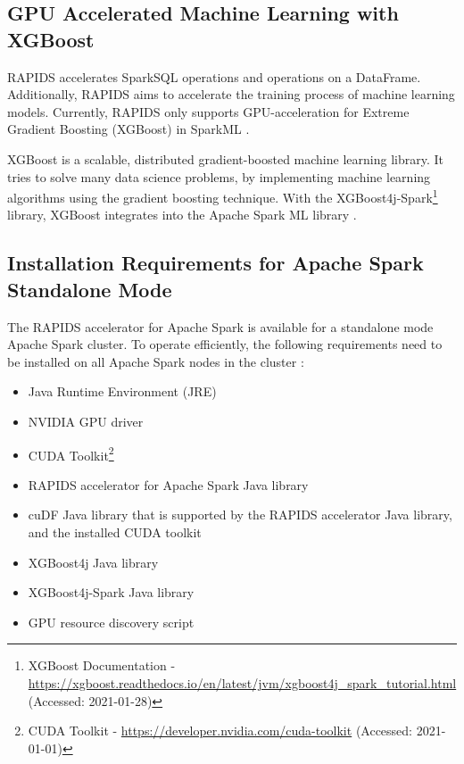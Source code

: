 \subsection{GPU Accelerated Machine Learning with XGBoost}
RAPIDS accelerates SparkSQL operations and operations on a DataFrame. Additionally, RAPIDS aims to accelerate the training process of machine learning models.
Currently, RAPIDS only supports GPU-acceleration for Extreme Gradient Boosting (XGBoost) in SparkML \cite{Mcdonald2020SparkRapids}.


XGBoost is a scalable, distributed gradient-boosted machine learning library. It tries to solve many data science problems, by implementing machine learning algorithms using the gradient boosting technique.
With the XGBoost4j-Spark\footnote{XGBoost Documentation - \url{https://xgboost.readthedocs.io/en/latest/jvm/xgboost4j_spark_tutorial.html} (Accessed: 2021-01-28)} library, XGBoost integrates into the Apache Spark ML library \cite{XGBoost2021Docs}. 


\subsection{Installation Requirements for Apache Spark Standalone Mode}
\label{subsec:04_rapids_req}
The RAPIDS accelerator for Apache Spark is available for a standalone mode Apache Spark cluster. To operate efficiently, the following requirements need to be installed on all Apache Spark nodes in the cluster \cite{SparkRapids2020Docs}:
\begin{itemize}
\item Java Runtime Environment (JRE)
\item NVIDIA GPU driver
\item CUDA Toolkit\footnote{CUDA Toolkit - \url{https://developer.nvidia.com/cuda-toolkit} (Accessed: 2021-01-01)}
\item RAPIDS accelerator for Apache Spark Java library
\item cuDF Java library that is supported by the RAPIDS accelerator Java library, and the installed CUDA toolkit
\item XGBoost4j Java library
\item XGBoost4j-Spark Java library
\item GPU resource discovery script
\end{itemize}


